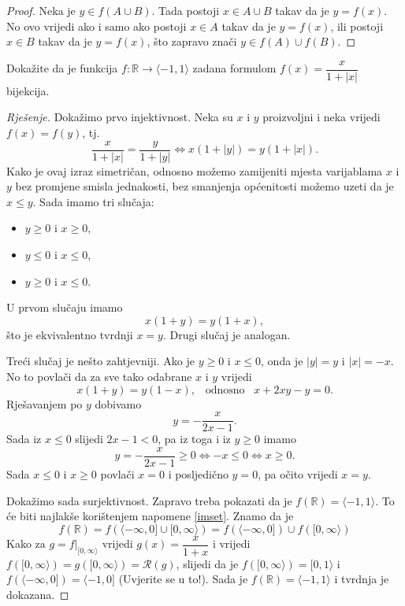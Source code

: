 \begin{proof}
Neka je $y\in f(A\cup B)$. Tada postoji $x\in A\cup B$ takav da je $y=f(x)$. No ovo vrijedi ako i samo ako postoji $x\in A$ takav da je $y=f(x)$, ili postoji $x\in B$ takav da je $y=f(x)$, što zapravo znači $y\in f(A)\cup f(B)$.
\end{proof}
\begin{exercise}
Dokažite da je funkcija $f : \mathbb{R} \to \langle -1, 1\rangle$ zadana formulom $f(x)=\dfrac{x}{1+|x|}$ bijekcija.
\end{exercise}
\begin{proof}[Rješenje]
Dokažimo prvo injektivnost. Neka su $x$ i $y$ proizvoljni i neka vrijedi $f(x)=f(y)$, tj.
$$\dfrac{x}{1+|x|}=\dfrac{y}{1+|y|}\Leftrightarrow x\left(1+|y|\right)=y\left(1+|x|\right).$$
Kako je ovaj izraz simetričan, odnosno možemo zamijeniti mjesta varijablama $x$ i $y$ bez promjene smisla jednakosti, bez smanjenja općenitosti možemo uzeti da je $x\leq y$. Sada imamo tri slučaja: 
\begin{itemize}
\item $y\geq 0$ i $x\geq 0$, 
\item $y\leq 0$ i $x\leq 0$, 
\item $y\geq 0$ i $x\leq 0$.
\end{itemize}
U prvom slučaju imamo 
$$x(1+y)=y(1+x),$$
što je ekvivalentno tvrdnji $x=y$. Drugi slučaj je analogan. 

Treći slučaj je nešto zahtjevniji. Ako je $y\geq 0$ i $x\leq 0$, onda je $|y|=y$ i $|x|=-x$. No to povlači da za sve tako odabrane $x$ i $y$ vrijedi $$x(1+y)=y(1-x),\;\;\;\text{odnosno}\;\;\;x+2xy-y=0.$$ Rješavanjem po $y$ dobivamo
$$y=-\dfrac{x}{2x-1}.$$
Sada iz $x\leq 0$ slijedi $2x-1<0$, pa iz toga i iz $y\geq 0$ imamo
$$y=-\dfrac{x}{2x-1}\geq 0\Leftrightarrow -x\leq 0\Leftrightarrow x\geq 0.$$
Sada $x\leq 0$ i $x\geq 0$ povlači $x=0$ i posljedično $y=0$, pa očito vrijedi $x=y$. 

Dokažimo sada surjektivnost. Zapravo treba pokazati da je $f(\mathbb{R})=\langle -1, 1\rangle$. To će biti najlakše korištenjem napomene \ref{imset}. Znamo da je 
$$f(\mathbb{R})=f\left(\langle -\infty, 0]\cup [0,\infty\rangle\right)=f\left(\langle -\infty, 0]\right)\cup f\left([0,\infty\rangle\right)$$
Kako za $g=f | _{[0, \infty\rangle}$ vrijedi $g(x)=\dfrac{x}{1+x}$ i vrijedi $f\left([0,\infty\rangle\right)=g\left([0,\infty\rangle\right)=\mathcal{R}(g)$, slijedi da je $f\left([0,\infty\rangle\right)=[0, 1\rangle$ i $f\left(\langle -\infty, 0]\right)=\langle -1, 0]$ (Uvjerite se u to!). Sada je $f(\mathbb{R})=\langle -1, 1\rangle$ i tvrdnja je dokazana.
\end{proof}
